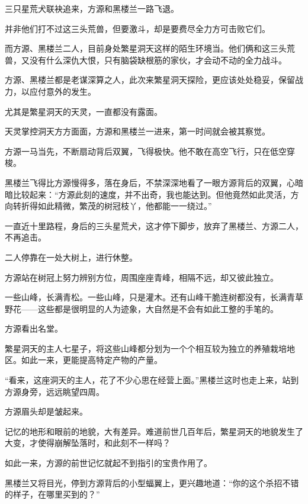 
\begin{this_body}



三只星荒犬联袂追来，方源和黑楼兰一路飞退。

并非他们打不过这三头荒兽，但要激斗，却是要费尽全力方可击败它们。

而方源、黑楼兰二人，目前身处繁星洞天这样的陌生环境当。他们俩和这三头荒兽，又没有什么深仇大恨，只有脑袋缺根筋的家伙，才会动不动的全力战斗。

方源、黑楼兰都是老谋深算之人，此次来繁星洞天探险，更应该处处稳妥，保留战力，以应付意外的发生。

尤其是繁星洞天的天灵，一直都没有露面。

天灵掌控洞天方方面面，方源和黑楼兰一进来，第一时间就会被其察觉。

方源一马当先，不断扇动背后双翼，飞得极快。他不敢在高空飞行，只在低空穿梭。

黑楼兰飞得比方源慢得多，落在身后，不禁深深地看了一眼方源背后的双翼，心暗暗比较起来：“方源此刻的速度，并不出奇，我也能达到。但他竟然如此灵活，方向转折得如此精微，繁茂的树冠枝丫，他都能一一绕过。”

一直近十里路程，身后的三头星荒犬，这才停下脚步，放弃了黑楼兰、方源二人，不再追击。

二人停靠在一处大树上，进行休整。

方源站在树冠上努力辨别方位，周围座座青峰，相隔不远，却又彼此独立。

一些山峰，长满青松。一些山峰，只是灌木。还有山峰干脆连树都没有，长满青草野花——这些都是很明显的人为迹象，大自然是不会有如此工整的手笔的。

方源看出名堂。

繁星洞天的主人七星子，将这些山峰都分划为一个个相互较为独立的养殖栽培地区。如此一来，更能提高特定产物的产量。

“看来，这座洞天的主人，花了不少心思在经营上面。”黑楼兰这时也走上来，站到方源身旁，远远眺望四周。

方源眉头却是皱起来。

记忆的地形和眼前的地貌，大有差异。难道前世几百年后，繁星洞天的地貌发生了大变，才使得崩解坠落时，和此刻不一样吗？

如此一来，方源的前世记忆就起不到指引的宝贵作用了。

黑楼兰又将目光，停到方源背后的小型蝠翼上，更兴趣地道：“你的这个杀招不错的样子，在哪里买到的？”


\end{this_body}
